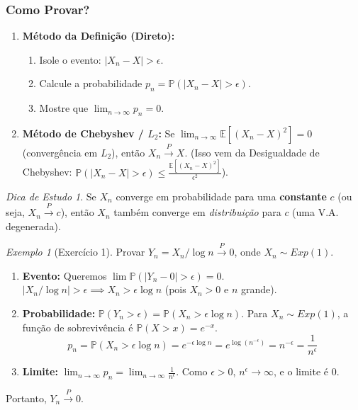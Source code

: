\documentclass[a4paper, 10pt]{article} %
\theoremstyle{definition}
\theoremstyle{plain}
\theoremstyle{remark}
\newtheorem{example}{Exemplo}[section]
\newtheorem*{tip}{Dica de Estudo} %
\newcommand{\E}{\mathbb{E}}
\newcommand{\Prob}{\mathbb{P}}
\newcommand{\pto}{\xrightarrow{P}}      %
\begin{document}
\subsubsection{Como Provar?}
\begin{enumerate}
    \item \textbf{Método da Definição (Direto):}
        \begin{enumerate}
            \item Isole o evento: $|X_n - X| > \epsilon$.
            \item Calcule a probabilidade $p_n = \Prob(|X_n - X| > \epsilon)$.
            \item Mostre que $\lim_{n \to \infty} p_n = 0$.
        \end{enumerate}
    \item \textbf{Método de Chebyshev / $L_2$:}
        Se $\lim_{n \to \infty} \E[(X_n - X)^2] = 0$ (convergência em $L_2$), então $X_n \pto X$.
        (Isso vem da Desigualdade de Chebyshev: $\Prob(|X_n - X| > \epsilon) \le \frac{\E[(X_n - X)^2]}{\epsilon^2}$).
\end{enumerate}

\begin{tip}
    Se $X_n$ converge em probabilidade para uma \textbf{constante} $c$ (ou seja, $X_n \pto c$), então $X_n$ também converge em \textit{distribuição} para $c$ (uma V.A. degenerada).
\end{tip}

\begin{example}[Exercício 1]
    Provar $Y_n = X_n / \log n \pto 0$, onde $X_n \sim Exp(1)$.
    \begin{enumerate}
        \item \textbf{Evento:} Queremos $\lim \Prob(|Y_n - 0| > \epsilon) = 0$.
        $|X_n / \log n| > \epsilon \implies X_n > \epsilon \log n$ (pois $X_n > 0$ e $n$ grande).
        \item \textbf{Probabilidade:} $\Prob(Y_n > \epsilon) = \Prob(X_n > \epsilon \log n)$.
        Para $X_n \sim Exp(1)$, a função de sobrevivência é $\Prob(X > x) = e^{-x}$.
        $$ p_n = \Prob(X_n > \epsilon \log n) = e^{-\epsilon \log n} = e^{\log(n^{-\epsilon})} = n^{-\epsilon} = \frac{1}{n^\epsilon} $$
        \item \textbf{Limite:} $\lim_{n \to \infty} p_n = \lim_{n \to \infty} \frac{1}{n^\epsilon}$. Como $\epsilon > 0$, $n^\epsilon \to \infty$, e o limite é 0.
    \end{enumerate}
    Portanto, $Y_n \pto 0$.
\end{example}
\end{document}
